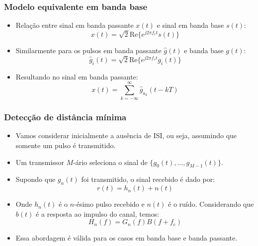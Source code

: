 \begin{frame}
	\frametitle{Modelo equivalente em banda base}

	\begin{itemize}
	    \item Relação entre sinal em banda passante $x(t)$ e sinal em banda base $s(t)$:
	    \begin{equation*}
		x(t) = \sqrt{2} \mathrm{Re}\{e^{j2\pi f_c t} s(t) \}
	    \end{equation*}
	    \item Similarmente para os pulsos em banda passante $\hat{g}(t)$ e banda base $g(t)$:
	    \begin{equation*}
		\hat{g}_i(t) = \sqrt{2} \mathrm{Re}\{e^{j2\pi f_c t} g_i(t) \}
	    \end{equation*}
	    \item Resultando no sinal em banda passante:
	     \begin{equation*}
		  x(t) = \sum_{k=-\infty}^{\infty} \hat{g}_{a_k}(t-kT)
	    \end{equation*}
	\end{itemize}			
\end{frame}

\begin{frame}
	\frametitle{Detecção de distância mínima}

	\begin{itemize}
	    \item Vamos considerar inicialmente a ausência de ISI, ou seja, assumindo que somente um pulso  é transmitido.
	    \item Um transmissor $M$-ário seleciona o sinal de $\{g_0(t), \ldots, g_{M-1}(t) \}$.
	    \item Supondo que $g_n(t)$ foi transmitido, o sinal recebido é dado por:
	    \begin{equation*}
		r(t) = h_n(t) + n(t)
	    \end{equation*}
	    \item Onde $h_n(t)$ é o $n$-ésimo pulso recebido e $n(t)$ é o ruído. Considerando que $b(t)$ é a resposta ao impulso do canal, temos:
	    \begin{equation*}
		H_n(f) = G_n(f)B(f+f_c)
	    \end{equation*}
	    \item Essa abordagem é válida para os casos em banda base e banda passante.
	\end{itemize}
\end{frame}

